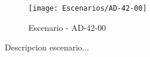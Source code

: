 \begin{figure}[H]
\centering
\texttt{[image: Escenarios/AD-42-00]}
\caption{Escenario - AD-42-00}
\label{fig:AD-42-00}
\end{figure}

Descripcion escenario...
\clearpage

